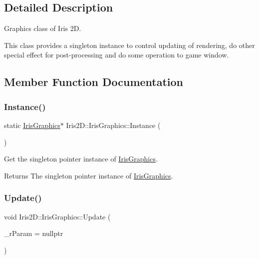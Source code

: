 \subsection{Detailed Description}
Graphics class of Iris 2D. 

This class provides a singleton instance to control updating of rendering, do other special effect for post-\/processing and do some operation to game window. 

\subsection{Member Function Documentation}
\mbox{\label{class_iris2_d_1_1_iris_graphics_a25533fd69478336d60c5b1f639802d3a}} 
\subsubsection{\texorpdfstring{Instance()}{Instance()}}
{\footnotesize\ttfamily static \hyperlink{class_iris2_d_1_1_iris_graphics}{Iris\+Graphics}$\ast$ Iris2\+D\+::\+Iris\+Graphics\+::\+Instance (\begin{DoxyParamCaption}{ }\end{DoxyParamCaption})\hspace{0.3cm}{\ttfamily [static]}}



Get the singleton pointer instance of \hyperlink{class_iris2_d_1_1_iris_graphics}{Iris\+Graphics}. 

\begin{DoxyReturn}{Returns}
The singleton pointer instance of \hyperlink{class_iris2_d_1_1_iris_graphics}{Iris\+Graphics}. 
\end{DoxyReturn}
\mbox{\label{class_iris2_d_1_1_iris_graphics_aa25debfc9a08d7084f48711a6bffdc4d}} 
\subsubsection{\texorpdfstring{Update()}{Update()}}
{\footnotesize\ttfamily void Iris2\+D\+::\+Iris\+Graphics\+::\+Update (\begin{DoxyParamCaption}\item[{Iris\+Result $\ast$}]{\+\_\+r\+Param = {\ttfamily nullptr} }\end{DoxyParamCaption})}



